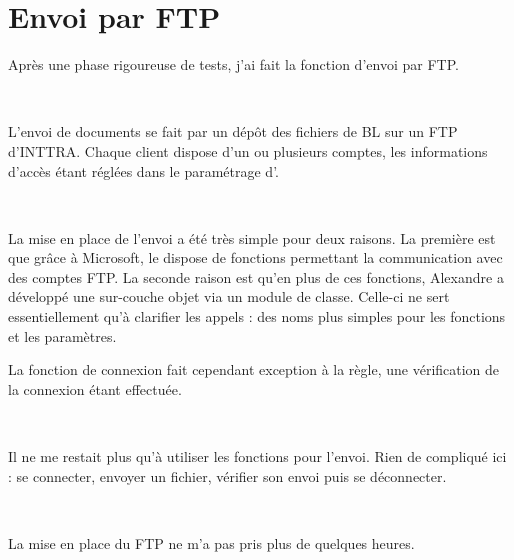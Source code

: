 \chapter{Envoi par FTP}
Après une phase rigoureuse de tests, j'ai fait la fonction d'envoi par FTP.

~

L'envoi de documents se fait par un dépôt des fichiers de BL sur un FTP d'INTTRA. Chaque client dispose d'un ou plusieurs comptes, les informations d'accès étant réglées dans le paramétrage d'\integrale.

~

La mise en place de l'envoi a été très simple pour deux raisons. La première est que grâce à Microsoft, le \vb{} dispose de fonctions permettant la communication avec des comptes FTP. La seconde raison est qu'en plus de ces fonctions, Alexandre a développé une sur-couche objet via un module de classe. Celle-ci ne sert essentiellement qu'à clarifier les appels : des noms plus simples pour les fonctions et les paramètres.

La fonction de connexion fait cependant exception à la règle, une vérification de la connexion étant effectuée.

~

Il ne me restait plus qu'à utiliser les fonctions pour l'envoi. Rien de compliqué ici : se connecter, envoyer un fichier, vérifier son envoi puis se déconnecter.

~

La mise en place du FTP ne m'a pas pris plus de quelques heures.
\vfill